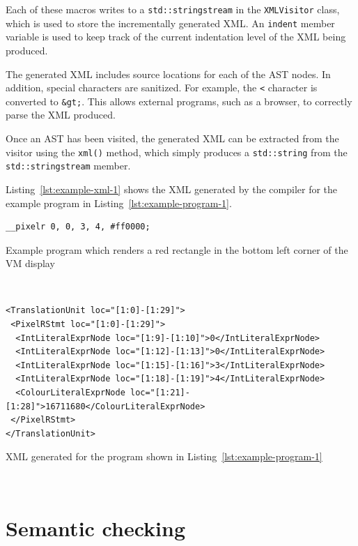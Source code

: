\documentclass[11pt,a4paper]{scrartcl}
\begin{document}
Each of these macros writes to a \verb!std::stringstream! in the \verb!XMLVisitor! class, which is used to store the incrementally generated XML. An \verb!indent! member variable is used to keep track of the current indentation level of the XML being produced.

The generated XML includes source locations for each of the AST nodes. In addition, special characters are sanitized. For example, the \verb!<! character is converted to \verb!&gt;!. This allows external programs, such as a browser, to correctly parse the XML produced.

Once an AST has been visited, the generated XML can be extracted from the visitor using the \verb!xml()! method, which simply produces a \verb!std::string! from the \verb!std::stringstream! member.

Listing~\ref{lst:example-xml-1} shows the XML generated by the compiler for the example program in Listing~\ref{lst:example-program-1}.

\begin{lstfloat}

\begin{verbatim}
__pixelr 0, 0, 3, 4, #ff0000;
\end{verbatim}
  \caption{Example program which renders a red rectangle in the bottom left corner of the VM display}~\label{lst:example-program-1}
\end{lstfloat}

\begin{lstfloat}

\begin{verbatim}
<TranslationUnit loc="[1:0]-[1:29]">
 <PixelRStmt loc="[1:0]-[1:29]">
  <IntLiteralExprNode loc="[1:9]-[1:10]">0</IntLiteralExprNode>
  <IntLiteralExprNode loc="[1:12]-[1:13]">0</IntLiteralExprNode>
  <IntLiteralExprNode loc="[1:15]-[1:16]">3</IntLiteralExprNode>
  <IntLiteralExprNode loc="[1:18]-[1:19]">4</IntLiteralExprNode>
  <ColourLiteralExprNode loc="[1:21]-[1:28]">16711680</ColourLiteralExprNode>
 </PixelRStmt>
</TranslationUnit>
\end{verbatim}
  \caption{XML generated for the program shown in Listing~\ref{lst:example-program-1}}~\label{lst:example-xml-1}

\end{lstfloat}

\newpage

\section{Semantic checking}~\label{sec:semantic-checker}
\end{document}
